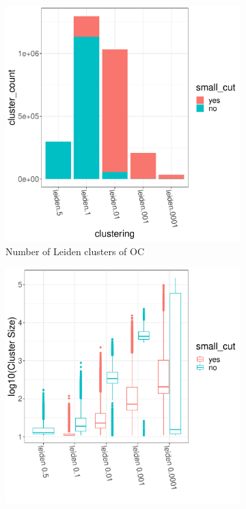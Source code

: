 \documentclass[11pt]{article}   	%
\begin{document}
\begin{figure}[H]
\centering
\begin{subfigure}[t]{0.45\textwidth}
\begin{center}
\includegraphics[width=0.9\linewidth]{figs/oc_istouched.pdf}
\caption{Number of Leiden clusters of OC}
\end{center}
\label{fig:ocistouched-part1}
\end{subfigure}
\begin{subfigure}[t]{0.45\textwidth}
\begin{center}
\includegraphics[width=0.9\linewidth]{figs/oc_boxplot.pdf}

\end{center}
\end{subfigure}
\end{figure}
\end{document}
